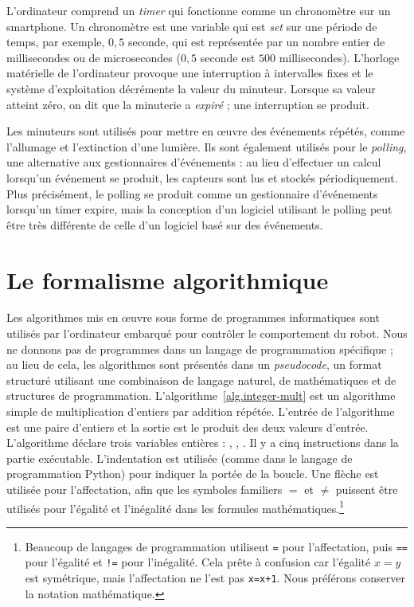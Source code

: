 L'ordinateur comprend un \emph{timer} qui fonctionne comme un chronomètre sur un smartphone. Un chronomètre est une variable qui est \emph{set} sur une période de temps, par exemple, $0,5$ seconde, qui est représentée par un nombre entier de millisecondes ou de microsecondes ($0,5$ seconde est $500$ millisecondes). L'horloge matérielle de l'ordinateur provoque une interruption à intervalles fixes et le système d'exploitation décrémente la valeur du minuteur. Lorsque sa valeur atteint zéro, on dit que la minuterie a \emph{expiré} ; une interruption se produit.

Les minuteurs sont utilisés pour mettre en œuvre des événements répétés, comme l'allumage et l'extinction d'une lumière. Ils sont également utilisés pour le \emph{polling}, une alternative aux gestionnaires d'événements : au lieu d'effectuer un calcul lorsqu'un événement se produit, les capteurs sont lus et stockés périodiquement. Plus précisément, le polling se produit comme un gestionnaire d'événements lorsqu'un timer expire, mais la conception d'un logiciel utilisant le polling peut être très différente de celle d'un logiciel basé sur des événements.

\section{Le formalisme algorithmique}\label{s.alg-formalism}

Les algorithmes mis en œuvre sous forme de programmes informatiques sont utilisés par l'ordinateur embarqué pour contrôler le comportement du robot. Nous ne donnons pas de programmes dans un langage de programmation spécifique ; au lieu de cela, les algorithmes sont présentés dans un \emph{pseudocode}, un format structuré utilisant une combinaison de langage naturel, de mathématiques et de structures de programmation. L'algorithme~\ref{alg.integer-mult} est un algorithme simple de multiplication d'entiers par addition répétée. L'entrée de l'algorithme est une paire d'entiers et la sortie est le produit des deux valeurs d'entrée. L'algorithme déclare trois variables entières : , , . Il y a cinq instructions dans la partie exécutable. L'indentation est utilisée (comme dans le langage de programmation Python) pour indiquer la portée de la boucle. Une flèche est utilisée pour l'affectation, afin que les symboles familiers $=$ et $\neq$ puissent être utilisés pour l'égalité et l'inégalité dans les formules mathématiques.\footnote{Beaucoup de langages de programmation utilisent \texttt{=} pour l'affectation, puis \texttt{==} pour l'égalité et \texttt{!=} pour l'inégalité. Cela prête à confusion car l'égalité $x=y$ est symétrique, mais l'affectation ne l'est pas \texttt{x=x+1}. Nous préférons conserver la notation mathématique.}

